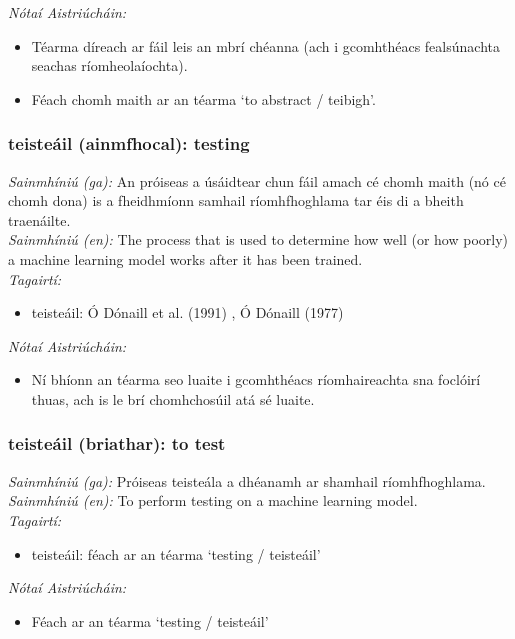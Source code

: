 \documentclass{article}
\begin{document}
 \noindent \textit{Nótaí Aistriúcháin:}
\begin{itemize}
	\item Téarma díreach ar fáil leis an mbrí chéanna (ach i gcomhthéacs fealsúnachta seachas ríomheolaíochta).
	\item Féach chomh maith ar an téarma `to abstract / teibigh'.
\end{itemize}


\subsubsection*{teisteáil (ainmfhocal): testing}
 \noindent \textit{Sainmhíniú (ga):} An próiseas a úsáidtear chun fáil amach cé chomh maith (nó cé chomh dona) is a fheidhmíonn samhail ríomhfhoghlama tar éis di a bheith traenáilte.
\\
 \noindent \textit{Sainmhíniú (en):} The process that is used to determine how well (or how poorly) a machine learning model works after it has been trained.
\\
 \noindent \textit{Tagairtí:}
\begin{itemize}
	\item teisteáil: Ó Dónaill et al. (1991) \cite{focloir-beag}, Ó Dónaill (1977) \cite{odonaill}
\end{itemize}

 \noindent \textit{Nótaí Aistriúcháin:}
\begin{itemize}
	\item Ní bhíonn an téarma seo luaite i gcomhthéacs ríomhaireachta sna foclóirí thuas, ach is le brí chomhchosúil atá sé luaite.
\end{itemize}


\subsubsection*{teisteáil (briathar): to test}
 \noindent \textit{Sainmhíniú (ga):} Próiseas teisteála a dhéanamh ar shamhail ríomhfhoghlama.
\\
 \noindent \textit{Sainmhíniú (en):} To perform testing on a machine learning model.
\\
 \noindent \textit{Tagairtí:}
\begin{itemize}
	\item teisteáil: féach ar an téarma `testing / teisteáil'
\end{itemize}

 \noindent \textit{Nótaí Aistriúcháin:}
\begin{itemize}
	\item Féach ar an téarma `testing / teisteáil'
\end{itemize}
\end{document}
